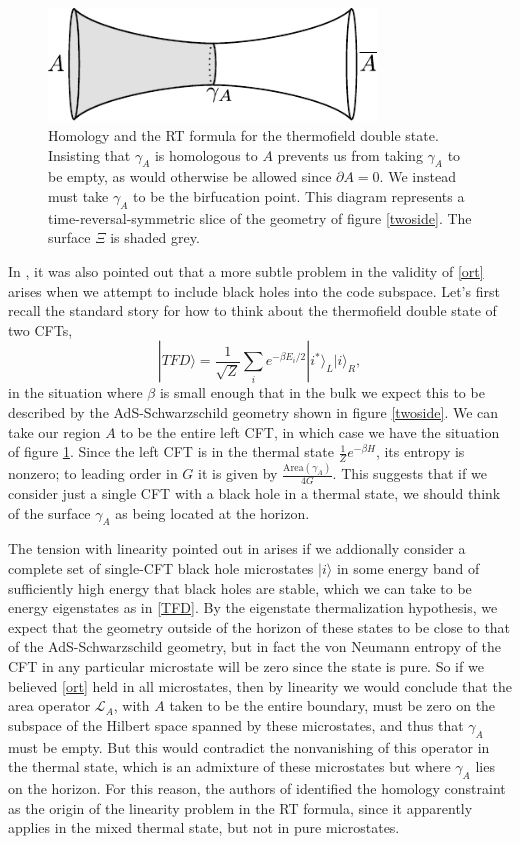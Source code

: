 \documentclass[12pt]{article}
\newcommand{\be}{\begin{equation}}
\newcommand{\ee}{\end{equation}}
\newcommand{\bfig}{\begin{figure}\begin{center}}
\newcommand{\efig}{\end{center}\end{figure}}
\newcommand{\ran}{\rangle}
\newcommand{\Ll}{\mathcal{L}}
\newcommand{\LA}{\Ll_A}
\begin{document}
\bfig
\includegraphics[height=3cm]{wormhole.pdf}
\caption{Homology and the RT formula for the thermofield double state.  Insisting that $\gamma_A$ is homologous to $A$ prevents us from taking $\gamma_A$ to be empty, as would otherwise be allowed since $\partial A=0$.  We instead must take $\gamma_A$ to be the birfucation point. This diagram represents a time-reversal-symmetric slice of the geometry of figure \ref{twoside}.  The surface $\Xi$ is shaded grey.}\label{wormhole}
\efig
In \cite{Almheiri:2016blp}, it was also pointed out that a more subtle problem in the validity of \eqref{ort} arises when we attempt to include black holes into the code subspace.  Let's first recall the standard story for how to think about the thermofield double state of two CFTs, 
\be\label{TFD}
|TFD\ran=\frac{1}{\sqrt{Z}}\sum_i e^{-\beta E_i/2}|i^*\ran_L|i\ran_R,
\ee
in the situation where $\beta$ is small enough that in the bulk we expect this to be described by the AdS-Schwarzschild geometry shown in figure \ref{twoside}.  We can take our region $A$ to be the entire left CFT, in which case we have the situation of figure \ref{wormhole}.  Since the left CFT is in the thermal state $\frac{1}{Z} e^{-\beta H}$, its entropy is nonzero; to leading order in $G$ it is given by $\frac{\mathrm{Area}(\gamma_A)}{4G}$.  This suggests that if we consider just a single CFT with a black hole in a thermal state, we should think of the surface $\gamma_A$ as being located at the horizon.  

The tension with linearity pointed out in \cite{Almheiri:2016blp} arises if we addionally consider a complete set of single-CFT black hole microstates $|i\ran$ in some energy band of sufficiently high energy that black holes are stable, which we can take to be energy eigenstates as in \eqref{TFD}.  By the eigenstate thermalization hypothesis, we expect that the geometry outside of the horizon of these states to be close to that of the AdS-Schwarzschild geometry, but in fact the von Neumann entropy of the CFT in any particular microstate will be zero since the state is pure.  So if we believed \eqref{ort} held in all microstates, then by linearity we would conclude that the area operator $\LA$, with $A$ taken to be the entire boundary, must be zero on the subspace of the Hilbert space spanned by these microstates, and thus that $\gamma_A$ must be empty.  But this would contradict the nonvanishing of this operator in the thermal state, which is an admixture of these microstates but where $\gamma_A$ lies on the horizon.  For this reason, the authors of \cite{Almheiri:2016blp} identified the homology constraint as the origin of the linearity problem in the RT formula, since it apparently applies in the mixed thermal state, but not in pure microstates.  
\end{document}
